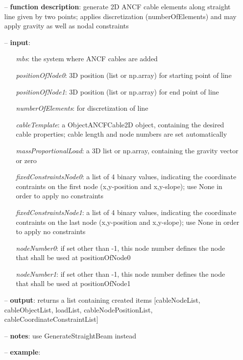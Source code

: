 \begin{itemize}[leftmargin=1.4cm]
\begin{itemize}[leftmargin=1.4cm]
\begin{itemize}[leftmargin=1.4cm]
\begin{itemize}[leftmargin=0.5cm]
\begin{itemize}[leftmargin=1.4cm]
\begin{flushleft}
\end{flushleft}
\setlength{\itemindent}{0.7cm}
\begin{itemize}[leftmargin=0.7cm]
\item[--]
{\bf function description}: generate 2D ANCF cable elements along straight line given by two points; applies discretization (numberOfElements) and may apply gravity as well as nodal constraints
\item[--]
{\bf input}: \vspace{-6pt}
\begin{itemize}[leftmargin=1.2cm]
\setlength{\itemindent}{-0.7cm}
\item[]{\it mbs}: the system where ANCF cables are added
\item[]{\it positionOfNode0}: 3D position (list or np.array) for starting point of line
\item[]{\it positionOfNode1}: 3D position (list or np.array) for end point of line
\item[]{\it numberOfElements}: for discretization of line
\item[]{\it cableTemplate}: a ObjectANCFCable2D object, containing the desired cable properties; cable length and node numbers are set automatically
\item[]{\it massProportionalLoad}: a 3D list or np.array, containing the gravity vector or zero
\item[]{\it fixedConstraintsNode0}: a list of 4 binary values, indicating the coordinate contraints on the first node (x,y-position and x,y-slope); use None in order to apply no constraints
\item[]{\it fixedConstraintsNode1}: a list of 4 binary values, indicating the coordinate contraints on the last node (x,y-position and x,y-slope); use None in order to apply no constraints
\item[]{\it nodeNumber0}: if set other than -1, this node number defines the node that shall be used at positionOfNode0
\item[]{\it nodeNumber1}: if set other than -1, this node number defines the node that shall be used at positionOfNode1
\end{itemize}
\item[--]
{\bf output}: returns a list containing created items [cableNodeList, cableObjectList, loadList, cableNodePositionList, cableCoordinateConstraintList]
\item[--]
{\bf notes}: use GenerateStraightBeam instead
\item[--]
{\bf example}: \vspace{-12pt}\ei\begin{lstlisting}[language=Python, xleftmargin=36pt]

\end{lstlisting}
\end{itemize}
\end{itemize}
\end{itemize}
\end{itemize}
\end{itemize}
\end{itemize}
